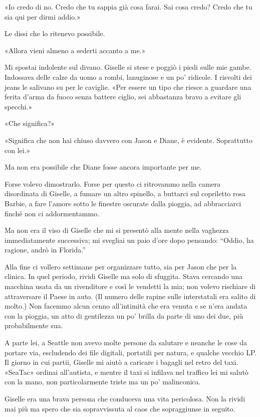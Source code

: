 «Io credo di no. Credo che tu sappia già cosa farai. Sai cosa credo?
Credo che tu sia qui per dirmi addio.»

Le dissi che lo ritenevo possibile.

«Allora vieni almeno a sederti accanto a me.»

Mi spostai indolente sul divano. Giselle si stese e poggiò i piedi sulle
mie gambe. Indossava delle calze da uomo a rombi, lanuginose e un po'
ridicole. I risvolti dei jeans le salivano su per le caviglie. «Per
essere un tipo che riesce a guardare una ferita d'arma da fuoco senza
battere ciglio, sei abbastanza bravo a evitare gli specchi.»

«Che significa?»

«Significa che non hai chiuso davvero con Jason e Diane, è evidente.
Soprattutto con lei.»

Ma non era possibile che Diane fosse ancora importante per me.

Forse volevo dimostrarlo. Forse per questo ci ritrovammo nella camera
disordinata di Giselle, a fumare un altro spinello, a buttarci sul
copriletto rosa Barbie, a fare l'amore sotto le finestre oscurate dalla
pioggia, ad abbracciarci finché non ci addormentammo.

Ma non era il viso di Giselle che mi si presentò alla mente nella
vaghezza immediatamente successiva; mi svegliai un paio d'ore dopo
pensando: ``Oddio, ha ragione, andrò in Florida.''

\separatorefiori

Alla fine ci vollero settimane per organizzare tutto, sia per Jason che
per la clinica. In quel periodo, rividi Giselle ma solo di sfuggita.
Stava cercando una macchina usata da un rivenditore e così le vendetti
la mia; non volevo rischiare di attraversare il Paese in auto. (Il
numero delle rapine sulle interstatali era salito di molto.) Non facemmo
alcun cenno all'intimità che era venuta e se n'era andata con la
pioggia, un atto di gentilezza un po' brilla da parte di uno dei due,
più probabilmente sua.

A parte lei, a Seattle non avevo molte persone da salutare e neanche le
cose da portare via, escludendo dei file digitali, portatili per natura,
e qualche vecchio LP. Il giorno in cui partii, Giselle mi aiutò a
caricare i bagagli nel retro del taxi. «SeaTac» ordinai all'autista, e
mentre il taxi si infilava nel traffico lei mi salutò con la mano, non
particolarmente triste ma un po' malinconica.

Giselle era una brava persona che conduceva una vita pericolosa. Non la
rividi mai più ma spero che sia sopravvissuta al caos che sopraggiunse
in seguito.

